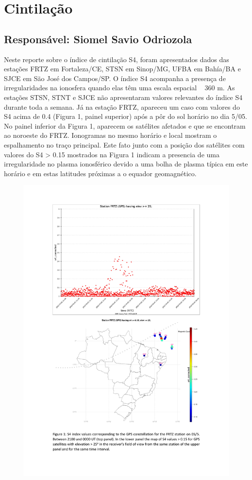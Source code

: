 \documentclass[a4paper, 10pt]{article}
\begin{document}
\section{Cintilação} 
 \subsection{Responsável: Siomel Savio Odriozola} 
 
Neste reporte sobre o índice de cintilação S4, foram apresentados dados das 
estações FRTZ em Fortaleza/CE, STSN em Sinop/MG, UFBA em Bahía/BA e 
SJCE em São José dos Campos/SP. O índice S4 acompanha a presença de 
irregularidades na ionosfera quando elas têm uma escala espacial ~ 360 m.  
As estações STSN, STNT e SJCE não apresentaram valores relevantes do 
índice S4 durante toda a semana. Já na estação FRTZ, apareceu um caso com 
valores do S4 acima de 0.4 (Figura 1, painel superior) após a pôr do sol horário 
no dia 5/05. No painel inferior da Figura 1, aparecem os satélites afetados e que 
se encontram ao noroeste do FRTZ. Ionogramas no mesmo horário e local 
mostram o espalhamento no traço principal. Este fato junto com a posição dos 
satélites com valores do S4 > 0.15 mostrados na Figura 1 indicam a presencia 
de uma irregularidade no plasma ionosférico devido a uma bolha de plasma 
típica em este horário e em estas latitudes próximas a o equador geomagnético. 

    \begin{figure}[H]
        \centering
        \includegraphics[width=14cm]{./figures/pt_outfileScint_0.jpg}
    \end{figure} 
 
\end{document}
